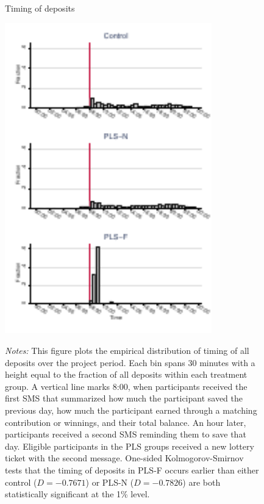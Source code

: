 \documentclass[11pt]{article}
\begin{document}
		\begin{figure}[ht]
		\centering
		\caption{Timing of deposits}
		\includegraphics[width=0.8\textwidth]{../../figures/hist-deposits.pdf}
		\label{fig:hist-deposits}
		\caption*{\footnotesize \emph{Notes:} This figure plots the empirical distribution of timing of all deposits over the project period. Each bin spans 30 minutes with a height equal to the fraction of all deposits within each treatment group. A vertical line marks 8:00, when participants received the first SMS that summarized how much the participant saved the previous day, how much the participant earned through a matching contribution or winnings, and their total balance. An hour later, participants received a second SMS reminding them to save that day. Eligible participants in the PLS groups received a new lottery ticket with the second message. One-sided Kolmogorov-Smirnov tests that the timing of deposits in PLS-F occurs earlier than either control ($D = -0.7671$) or PLS-N ($D = -0.7826$) are both statistically significant at the 1\% level.}
		\end{figure}
\end{document}
